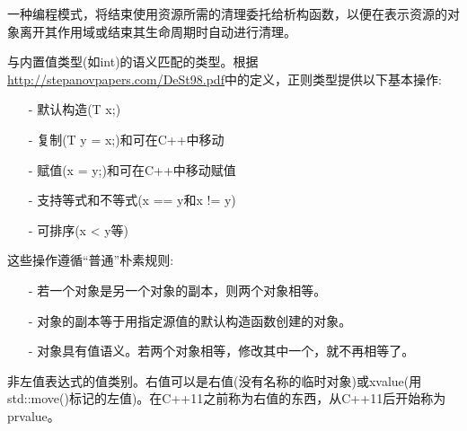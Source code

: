 



一种编程模式，将结束使用资源所需的清理委托给析构函数，以便在表示资源的对象离开其作用域或结束其生命周期时自动进行清理。



与内置值类型(如int)的语义匹配的类型。根据\url{http://stepanovpapers.com/DeSt98.pdf}中的定义，正则类型提供以下基本操作:

\begin{itemize}
\item [-]
默认构造(T x;)

\item [-]
复制(T y = x;)和可在C++中移动

\item [-]
赋值(x = y;)和可在C++中移动赋值

\item [-]
支持等式和不等式(x == y和x != y)

\item [-]
可排序(x < y等)
\end{itemize}

这些操作遵循“普通”朴素规则:

\begin{itemize}
\item [-]
若一个对象是另一个对象的副本，则两个对象相等。

\item [-]
对象的副本等于用指定源值的默认构造函数创建的对象。

\item [-]
对象具有值语义。若两个对象相等，修改其中一个，就不再相等了。
\end{itemize}


非左值表达式的值类别。右值可以是右值(没有名称的临时对象)或xvalue(用std::move()标记的左值)。在C++11之前称为右值的东西，从C++11后开始称为prvalue。

















